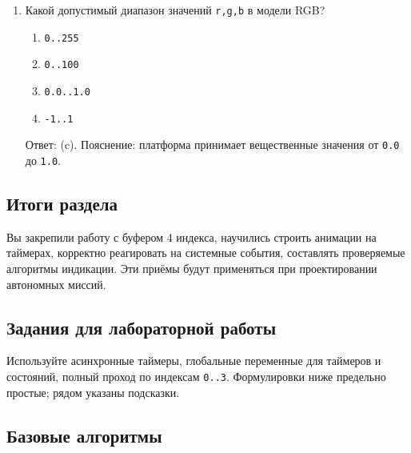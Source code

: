 \begin{enumerate}
  \item Какой допустимый диапазон значений \verb|r,g,b| в модели RGB?
  \begin{enumerate}[label=(\alph*)]
    \item \verb|0..255| \item \verb|0..100| \item \verb|0.0..1.0| \item \verb|-1..1|
  \end{enumerate}
  Ответ: (c). Пояснение: платформа принимает вещественные значения от \verb|0.0| до \verb|1.0|.
\end{enumerate}
\subsection*{Итоги раздела}
Вы закрепили работу с буфером 4 индекса, научились строить анимации на таймерах, корректно реагировать на системные события, составлять проверяемые алгоритмы индикации. Эти приёмы будут применяться при проектировании автономных миссий.

\subsection{Задания для лабораторной работы}
Используйте асинхронные таймеры, глобальные переменные для таймеров и состояний, полный проход по индексам \verb|0..3|. Формулировки ниже предельно простые; рядом указаны подсказки.
\subsection{Базовые алгоритмы}

